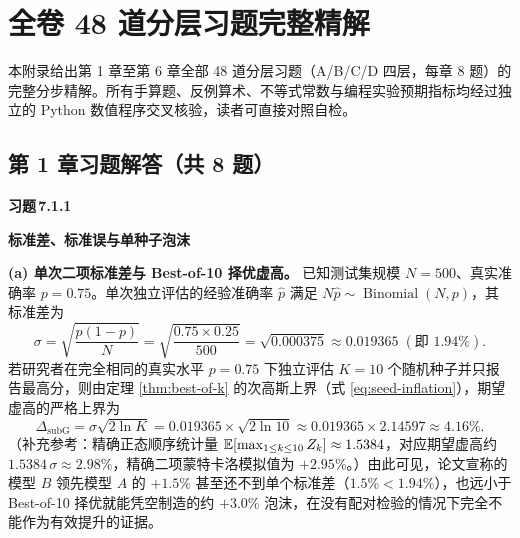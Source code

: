 \renewcommand{\chaptermark}[1]{\markboth{附录 \thechapter\quad #1}{}}
\newcommand{\solItem}[2]{%
  \par\vspace{4.5mm}\noindent
  \colorbox{tealLight}{\strut\;\sffamily\bfseries\footnotesize\color{tealDark}习题\,#1\;}\;%
  {\normalsize\sffamily\bfseries\color{ink}#2}\par\nopagebreak\vspace{1.2mm}%
}

\chapter[全卷 48 道分层习题完整精解]{全卷 48 道分层习题完整精解}
\label{app:solutions}


本附录给出第 1 章至第 6 章全部 48 道分层习题（A/B/C/D 四层，每章 8 题）的完整分步精解。所有手算题、反例算术、不等式常数与编程实验预期指标均经过独立的 Python 数值程序交叉核验，读者可直接对照自检。

\section*{第 1 章习题解答（共 8 题）}

\solItem{7.1.1}{标准差、标准误与单种子泡沫}

\textbf{(a) 单次二项标准差与 Best-of-10 择优虚高。}
已知测试集规模 $N = 500$、真实准确率 $p = 0.75$。单次独立评估的经验准确率 $\hat{p}$ 满足 $N\hat{p} \sim \operatorname{Binomial}(N, p)$，其标准差为
\[
  \sigma = \sqrt{\frac{p(1 - p)}{N}} = \sqrt{\frac{0.75 \times 0.25}{500}}
  = \sqrt{0.000375} \approx \mathbf{0.019365} \;(\text{即 } \mathbf{1.94\%}).
\]
若研究者在完全相同的真实水平 $p = 0.75$ 下独立评估 $K = 10$ 个随机种子并只报告最高分，则由定理 \ref{thm:best-of-k} 的次高斯上界（式 \eqref{eq:seed-inflation}），期望虚高的严格上界为
\[
  \Delta_{\text{subG}} = \sigma\sqrt{2\ln K}
  = 0.019365 \times \sqrt{2\ln 10}
  \approx 0.019365 \times 2.14597
  \approx \mathbf{4.16\%}.
\]
（补充参考：精确正态顺序统计量 $\mathbb{E}[\max_{1\le k\le 10} Z_k] \approx 1.5384$，对应期望虚高约 $1.5384\,\sigma \approx 2.98\%$，精确二项蒙特卡洛模拟值为 $+2.95\%$。）由此可见，论文宣称的模型 $B$ 领先模型 $A$ 的 $+1.5\%$ 甚至还不到单个标准差（$1.5\% < 1.94\%$），也远小于 Best-of-10 择优就能凭空制造的约 $+3.0\%$ 泡沫，在没有配对检验的情况下完全不能作为有效提升的证据。

